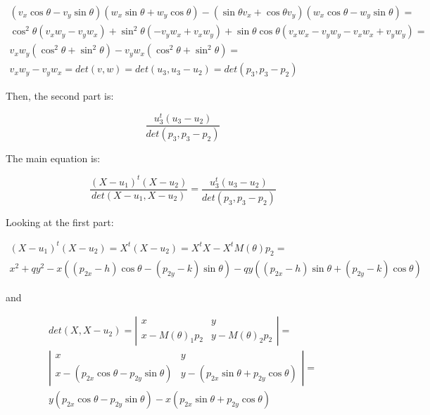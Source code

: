 \documentclass{article}
\begin{document}
\begin{equation*}
\begin{split}
(v_x\cos{\theta}-v_y\sin{\theta})(w_x\sin{\theta} + w_y\cos{\theta})-(\sin{\theta}v_x + \cos{\theta}v_y)(w_x\cos{\theta} - w_y\sin{\theta})=\\
\cos^2{\theta}(v_xw_y-v_yw_x)+\sin^2{\theta}(-v_yw_x+v_xw_y) + \sin{\theta}\cos{\theta}(v_xw_x-v_yw_y-v_xw_x+v_yw_y)=\\
v_xw_y(\cos^2{\theta}+\sin^2{\theta}) - v_yw_x(\cos^2{\theta}+\sin^2{\theta})=\\
v_xw_y-v_yw_x=det(v, w) = det(u_3, u_3-u_2) = det(p_3, p_3-p_2)
\end{split}
\end{equation*}

Then, the second part is:

\begin{equation}
\dfrac{u_3^t(u_3-u_2)}{det(p_3, p_3-p_2)}
\end{equation}

The main equation is:

\begin{equation}
\dfrac{(X-u_1)^t(X-u_2)}{det(X-u_1, X-u_2)} = \dfrac{u_3^t(u_3-u_2)}{det(p_3, p_3-p_2)}
\end{equation}

Looking at the first part:

\begin{eqnarray*}
 	(X-u_1)^t(X-u_2)=X^t(X-u_2)=X^tX -X^tM(\theta)p_2=\\
 	x^2 + qy^2 - x((p_{2x}-h)\cos{\theta} - (p_{2y}-k)\sin{\theta}) - qy((p_{2x}-h)\sin{\theta} + (p_{2y}-k)\cos{\theta})
\end{eqnarray*}

and

\begin{eqnarray*}
det(X,X-u_2)=\left|
\begin{array}{cc}
x & y\\
x - M(\theta)_1p_2 & y - M(\theta)_2p_2 
\end{array}
\right| =\\
\left|
\begin{array}{cc}
	x & y\\
	x -(p_{2x}\cos{\theta} - p_{2y}\sin{\theta}) & y - (p_{2x}\sin{\theta} + p_{2y}\cos{\theta}) 
\end{array}
\right|=\\
y(p_{2x}\cos{\theta} - p_{2y}\sin{\theta}) - x(p_{2x}\sin{\theta} + p_{2y}\cos{\theta})
\end{eqnarray*}
\end{document}

